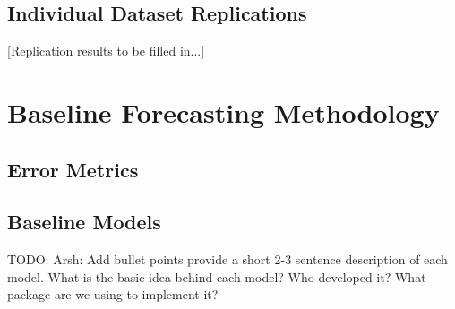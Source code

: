 \documentclass{article}
\begin{document}
\subsection{Individual Dataset Replications}

[Replication results to be filled in...]

\section{Baseline Forecasting Methodology}
\label{sec:methodology}


\subsection{Error Metrics}

\subsection{Baseline Models}
TODO: Arsh: Add bullet points provide a short 2-3 sentence description of each model. What is the basic idea behind each model? Who developed it? What package are we using to implement it? 
\end{document}
